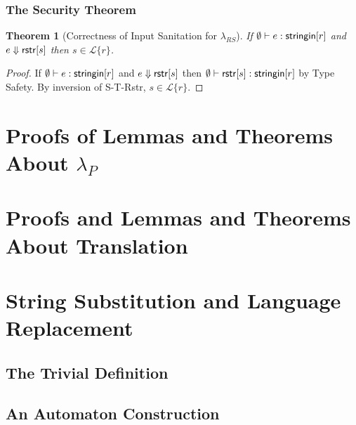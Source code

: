 \documentclass[12pt]{article}
\newtheorem{thm}{Theorem}
\theoremstyle{definition}
\newcommand{\Lagr}{\mathcal{L}}
\newcommand{\lang}[1]{\Lagr\{#1\}}
\newcommand{\lambdas}{\lambda_{RS}}
\newcommand{\lambdap}{\lambda_P}
\newcommand{\stringin}[1]{{\sf stringin}[#1]}
\newcommand{\sreduces}{ \Downarrow }
\begin{document}
\subsubsection{The Security Theorem}\label{sec:securitythm}

\begin{thm}[Correctness of Input Sanitation for $\lambdas$]\label{thm:scorrect}
  If  $\emptyset \vdash e : \stringin{r}$ and $e \sreduces \rstr{s}$ then $s \in \lang{r}$.
\end{thm}
\begin{proof}
If $\emptyset \vdash e : \stringin{r}$ and $e \sreduces \rstr{s}$ then $\emptyset \vdash \rstr{s} : \stringin{r}$ by Type Safety.
By inversion of S-T-Rstr, $s \in \lang{r}$.
\end{proof}



\section{Proofs of Lemmas and Theorems About $\lambdap$}

\section{Proofs and Lemmas and Theorems About Translation}



\section{String Substitution and Language Replacement}

\subsection{The Trivial Definition}

\subsection{An Automaton Construction}
\end{document}
